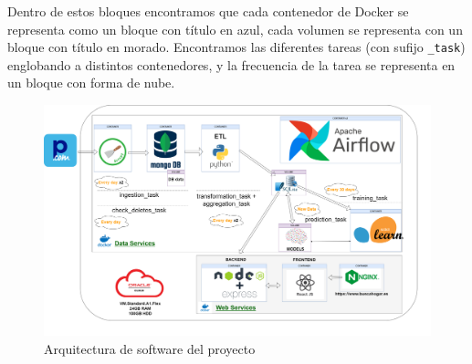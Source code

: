 Dentro de estos bloques encontramos que cada contenedor de Docker se representa como un bloque con título en azul, cada volumen se representa con un bloque con título en morado. Encontramos las diferentes tareas (con sufijo \texttt{\_task}) englobando a distintos contenedores, y la frecuencia de la tarea se representa en un bloque con forma de nube.

\begin{figure} 
    \centering
    \begin{adjustbox}{center}
	    \includegraphics[width=1.1\textwidth]{img/arquitectura.png}
    \end{adjustbox}
    \caption{Arquitectura de software del proyecto}
    \label{fig:arquitectura_general}
\end{figure}
\clearpage 


